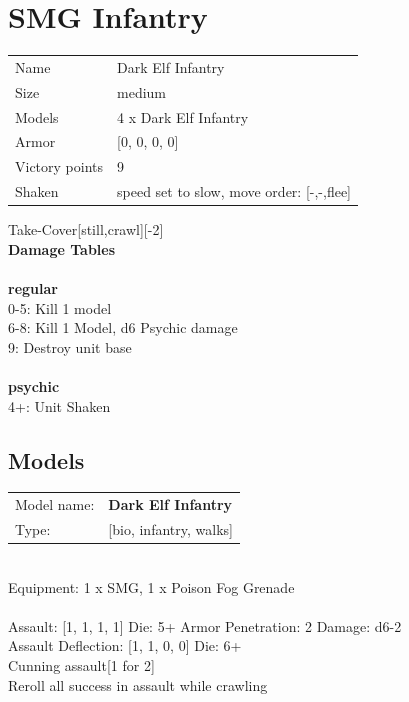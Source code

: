 \clearpage

\section{ SMG Infantry }

\begin{tabular}{ll}
  Name & Dark Elf Infantry \\
  Size & medium\\
  Models & 4 x Dark Elf Infantry\\
  Armor & [0, 0, 0, 0]\\
  Victory points & 9\\
  Shaken & speed set to slow, move order: [-,-,flee]\\
\end{tabular}

Take-Cover[still,crawl][-2]\\ 



{\bf Damage Tables} \\
\ \\ {\bf regular } \\
0-5: Kill 1 model \\
6-8: Kill 1 Model, d6 Psychic damage \\
9: Destroy unit base \\
\ \\ {\bf psychic } \\
4+: Unit Shaken \\


\clearpage

\subsection{ Models }

\begin{tabular}{ll}
Model name: & {\bf Dark Elf Infantry } \\
Type: & [bio, infantry, walks] \\
\end{tabular}
\ \\
Equipment: 1 x SMG, 1 x Poison Fog Grenade \\
\ \\
Assault: [1, 1, 1, 1] Die: 5+ Armor Penetration: 2 Damage: d6-2 \\
Assault Deflection: [1, 1, 0, 0] Die: 6+\\
\indent Cunning assault[1 for 2]\\ 
Reroll all success in assault while crawling\\ 
 
